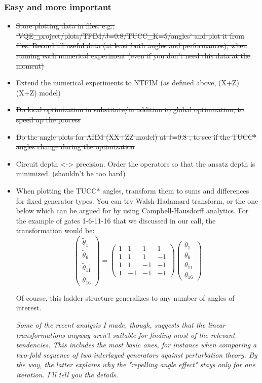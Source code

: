 \documentclass[10pt, a4paper]{article}
\begin{document}
\subsubsection*{Easy and more important}
\begin{itemize}
\item \st{Store plotting data in files: e.g., `VQE\_project/plots/TFIM/J=0.8/TUCC\_K=5/angles' and plot it from files. Record all useful data (at least both angles and performances), when running each numerical experiment (even if you don't need this data at the moment)}
\item Extend the numerical experiments to NTFIM (as defined above, (X+Z)(X+Z) model)
\item \st{Do local optimization in substitute/in addition to global optimization, to speed up the process}
\item \st{Do the angle plots for AHM (XX+ZZ model) at J=0.8 , to see if the TUCC* angles change during the optimization}

\item Circuit depth <-> precision. Order the operators so that the ansatz depth is minimized. (shouldn't be too hard)

\item When plotting the TUCC* angles, transform them to sums and differences for fixed generator types. You can try Walsh-Hadamard transform, or the one below which can be argued for by using Campbell-Hausdorff analytics. For the example of gates 1-6-11-16 that we discussed in our call, the transformation would be:
\begin{equation}
\begin{pmatrix}
\tilde{\theta}_1 \\
\tilde{\theta}_6 \\
\tilde{\theta}_{11} \\
\tilde{\theta}_{16} 
\end{pmatrix}=\begin{pmatrix}
1 & 1 & 1 & 1\\
1 & 1 & 1 & -1\\
1 & 1 & -1 & -1 \\
1 & -1 & -1 & -1
\end{pmatrix}
\begin{pmatrix}
\theta_1 \\
\theta_6 \\
\theta_{11} \\
\theta_{16} 
\end{pmatrix}
\end{equation}

Of course, this ladder structure generalizes to any number of angles of interest.

\textit{Some of the recent analysis I made, though, suggests that the linear transformations anyway aren't suitable for finding most of the relevant tendencies. This includes the most basic ones, for instance when comparing a two-fold sequence of two interlayed generators against perturbation theory. By the way, the latter explains why the "repelling angle effect" stays only for one iteration. I'll tell you the details.}

\end{itemize}
\end{document}
